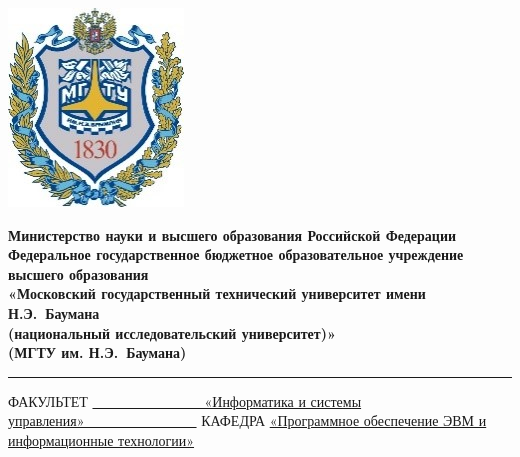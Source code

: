 \documentclass[12pt]{report}
\begin{document}
\begin{titlepage}
	\fontsize{12pt}{12pt}\selectfont
	\noindent \begin{minipage}{0.15\textwidth}
		\includegraphics[width=\linewidth]{inc/img/b_logo.jpg}
	\end{minipage}
	\noindent\begin{minipage}{0.9\textwidth}\centering
		\textbf{Министерство науки и высшего образования Российской Федерации}\\
		\textbf{Федеральное государственное бюджетное образовательное учреждение высшего образования}\\
		\textbf{«Московский государственный технический университет имени Н.Э.~Баумана}\\
		\textbf{(национальный исследовательский университет)»}\\
		\textbf{(МГТУ им. Н.Э.~Баумана)}
	\end{minipage}
	
	\noindent\rule{15cm}{3pt}
	\newline\newline
	\noindent ФАКУЛЬТЕТ \underline{~~~~~~~~~~~~~~~~«Информатика и системы управления»~~~~~~~~~~~~~~~~} \newline\newline
	\noindent КАФЕДРА \underline{«Программное обеспечение ЭВМ и информационные технологии»}\newline\newline\newline\newline\newline\newline\newline
	

\end{titlepage}
\end{document}
